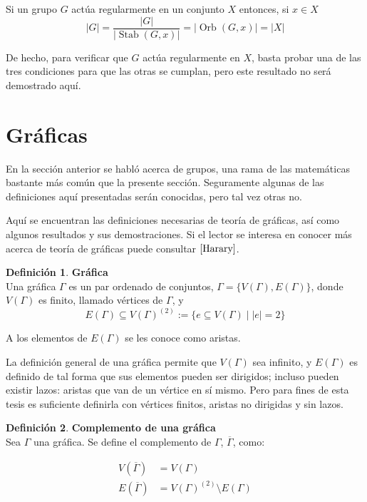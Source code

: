 \documentclass[11pt]{book}
\theoremstyle{definition}
\newtheorem{definition}{Definición}
\DeclareMathOperator{\Stab}{Stab}
\DeclareMathOperator{\orb}{Orb}
\begin{document}
Si un grupo $G$ actúa regularmente en un conjunto $X$ entonces, si $x \in X$
\begin{equation*}
  |G|=\frac{|G|}{|\Stab(G,x)|}
  = | \orb (G,x)|=|X|
\end{equation*}

De hecho, para verificar que $G$ actúa regularmente en $X$, basta
probar una de las tres condiciones para que las otras se cumplan, pero
este resultado no será demostrado aquí.

\section{Gráficas}

En la sección anterior se habló acerca de grupos, una rama de las
matemáticas bastante más común que la presente sección. Seguramente
algunas de las definiciones aquí presentadas serán conocidas, pero tal
vez otras no.

Aquí se encuentran las definiciones necesarias de teoría de gráficas,
así como algunos resultados y sus demostraciones. Si el lector se
interesa en conocer más acerca de teoría de gráficas puede consultar
$\cite{Harary}$.

\begin{definition}\textbf{Gráfica}\\
  Una gráfica $\Gamma$ es un par ordenado de conjuntos,
  $\Gamma=\{V(\Gamma),E(\Gamma)\}$, donde $V(\Gamma)$ es finito,
  llamado vértices de $\Gamma$, y
  \begin{equation*}
    E(\Gamma) \subseteq
    V(\Gamma)^{(2)}:=\{e\subseteq V(\Gamma) \mid |e|=2\}
  \end{equation*}
\end{definition}

A los elementos de $E(\Gamma)$ se les conoce como
aristas.

La definición general de una gráfica permite que $V(\Gamma)$ sea
infinito, y $E(\Gamma)$ es definido de tal forma que sus elementos
pueden ser dirigidos; incluso pueden existir
lazos: aristas que van de un vértice en sí mismo. Pero
para fines de esta tesis es suficiente definirla con vértices finitos,
aristas no dirigidas y sin lazos.

\begin{definition}\textbf{Complemento de una gráfica}\\
  Sea $\Gamma$ una gráfica. Se define el complemento de
  $\Gamma$, $\overline{\Gamma}$, como:

  \begin{equation*}
    \begin{split}
      V(\overline{\Gamma})&=V(\Gamma)\\
      E(\overline{\Gamma})&=V(\Gamma)^{(2)}\setminus E(\Gamma)
    \end{split}
  \end{equation*}

\end{definition}
\end{document}
